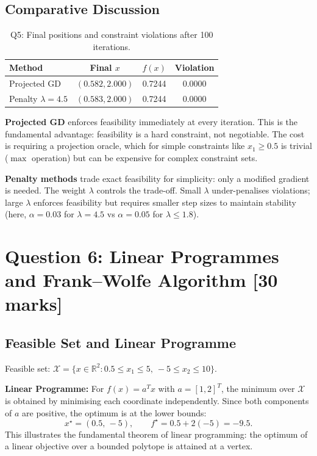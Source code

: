 \documentclass[11pt,a4paper]{article}
\begin{document}
\subsection{Comparative Discussion}

\begin{table}[H]
\centering
\caption{Q5: Final positions and constraint violations after 100 iterations.}
\label{tab:q5_final}
\begin{tabular}{lccc}
\toprule
\textbf{Method} & \textbf{Final $x$} & \textbf{$f(x)$} & \textbf{Violation} \\
\midrule
Projected GD & $(0.582, 2.000)$ & 0.7244 & 0.0000 \\
Penalty $\lambda = 4.5$ & $(0.583, 2.000)$ & 0.7244 & 0.0000 \\
\bottomrule
\end{tabular}
\end{table}

\textbf{Projected GD} enforces feasibility immediately at every iteration. This is the fundamental advantage: feasibility is a hard constraint, not negotiable. The cost is requiring a projection oracle, which for simple constraints like $x_1 \geq 0.5$ is trivial ($\max$ operation) but can be expensive for complex constraint sets.

\textbf{Penalty methods} trade exact feasibility for simplicity: only a modified gradient is needed. The weight $\lambda$ controls the trade-off. Small $\lambda$ under-penalises violations; large $\lambda$ enforces feasibility but requires smaller step sizes to maintain stability (here, $\alpha = 0.03$ for $\lambda = 4.5$ vs $\alpha = 0.05$ for $\lambda \leq 1.8$).

\section{Question 6: Linear Programmes and Frank--Wolfe Algorithm \hfill [30 marks]}
\label{sec:q6}

\subsection{Feasible Set and Linear Programme}

Feasible set: $\mathcal{X} = \{x \in \mathbb{R}^2 : 0.5 \leq x_1 \leq 5,\ -5 \leq x_2 \leq 10\}$.

\textbf{Linear Programme:} For $f(x) = a^T x$ with $a = [1, 2]^T$, the minimum over $\mathcal{X}$ is obtained by minimising each coordinate independently. Since both components of $a$ are positive, the optimum is at the lower bounds:
\begin{equation}
x^{\star} = (0.5,\, -5), \qquad f^{\star} = 0.5 + 2(-5) = -9.5.
\end{equation}
This illustrates the fundamental theorem of linear programming: the optimum of a linear objective over a bounded polytope is attained at a vertex.
\end{document}
